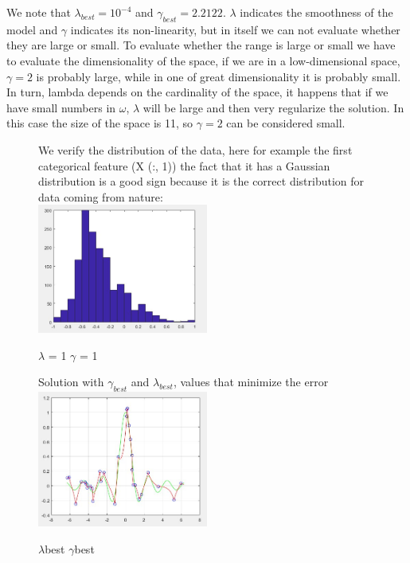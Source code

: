 We note that $\lambda_{best} = 10^{-4}$ and $\gamma_{best} = 2.2122$. $\lambda$ indicates the smoothness of the model and $\gamma$ indicates its non-linearity, but in itself we can not evaluate whether they are large or small.
To evaluate whether the range is large or small we have to evaluate the dimensionality of the space, if we are in a low-dimensional space, $\gamma = 2$ is probably large, while in one of great dimensionality it is probably small. In turn, lambda depends on the cardinality of the space, it happens that if we have small numbers in $\omega$, $\lambda$ will be large and then very regularize the solution.
In this case the size of the space is 11, so $\gamma = 2$ can be considered small.\\
\begin{figure}
We verify the distribution of the data, here for example the first categorical feature (X (:, 1)) the fact that it has a Gaussian distribution is a good sign because it is the correct distribution for data coming from nature:\\
	
	\includegraphics[width=0.5\textwidth]{hist1.png}
	\centering
	\caption{$\lambda$ = 1 $\gamma$ = 1}
	\label{fig:\lambda = 1 \gamma = 1}

	
\end{figure}

\begin{figure}

Solution with $\gamma_{best}$ and $\lambda_{best}$, values that minimize the error\\

	\includegraphics[width=0.5\textwidth]{kmlbgb.png}
	\centering
	\caption{$\lambda$best $\gamma$best}
	
	
\end{figure}

